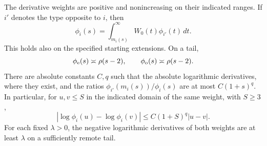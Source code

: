 \begin{lemma}\label{lem:derivative-weights}
The derivative weights are positive and nonincreasing on their indicated
ranges.  If \(i'\) denotes the type opposite to \(i\), then
\begin{equation}\label{eq:functions-derivative-integrals}
 \phi_i(s)=\int_{m_i(s)}^{\infty}W_0(t)\phi_{i'}(t)\,dt.
\end{equation}
This holds also on the specified starting extensions.
On a tail,
\begin{equation}\label{eq:functions-phi-dickman}
 \phi_\mathrm e(s)\asymp\rho(s-2),\qquad
 \phi_\mathrm o(s)\asymp\rho(s-2).
\end{equation}
There are absolute constants \(C,q\) such that the absolute logarithmic
derivatives, where they exist, and the ratios
\(\phi_{i'}(m_i(s))/\phi_i(s)\) are at most \(C(1+s)^q\).
In particular, for \(u,v\le S\) in the indicated domain of the
same weight, with \(S\ge3\),
\[
 |\log\phi_i(u)-\log\phi_i(v)|
 \le C(1+S)^q|u-v|.
\]
For each fixed \(\lambda>0\), the negative logarithmic derivatives
of both weights are at least \(\lambda\) on a sufficiently remote tail.
\end{lemma}

